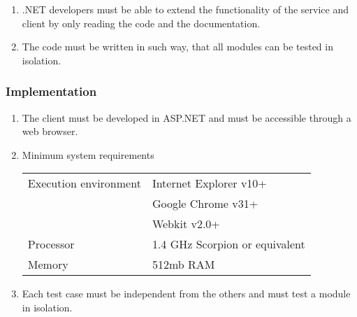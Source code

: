 \begin{enumerate}[label=\textbf{NFR-\twodigits*}, resume]
\item .NET developers must be able to extend the functionality of the service and client by only reading the code and the documentation.
\item The code must be written in such way, that all modules can be tested in isolation.
\end{enumerate}

\subsubsection{Implementation}
\begin{enumerate}[label=\textbf{NFR-\twodigits*}, resume]
\item The client must be developed in ASP.NET and must be accessible through a web browser.
\item Minimum system requirements


\begin{tabular}{| l | l | }
\hline
 Execution environment & Internet Explorer v10+\\
& Google Chrome v31+\\
& Webkit v2.0+\\ \hline
 Processor & 1.4 GHz Scorpion or equivalent \\ \hline
 Memory & 512mb RAM  \\ \hline

\end{tabular}

\item Each test case must be independent from the others and must test a module in isolation.
\end{enumerate}



%
